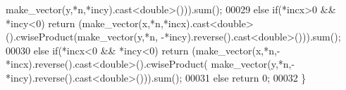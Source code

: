 \begin{DoxyCode}
      make\_vector(y,*n,*incy).cast<\textcolor{keywordtype}{double}>())).sum();
00029   \textcolor{keywordflow}{else} \textcolor{keywordflow}{if}(*incx>0 && *incy<0) \textcolor{keywordflow}{return} (make\_vector(x,*n,*incx).cast<\textcolor{keywordtype}{double}>().cwiseProduct(make\_vector(y,*n,
      -*incy).reverse().cast<\textcolor{keywordtype}{double}>())).sum();
00030   \textcolor{keywordflow}{else} \textcolor{keywordflow}{if}(*incx<0 && *incy<0) \textcolor{keywordflow}{return} (make\_vector(x,*n,-*incx).reverse().cast<\textcolor{keywordtype}{double}>().cwiseProduct(
      make\_vector(y,*n,-*incy).reverse().cast<\textcolor{keywordtype}{double}>())).sum();
00031   \textcolor{keywordflow}{else} \textcolor{keywordflow}{return} 0;
00032 \}
\end{DoxyCode}
